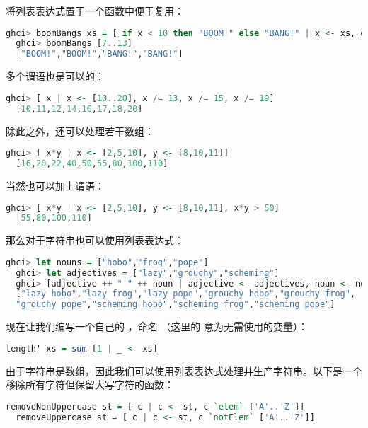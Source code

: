 \documentclass[./main.tex]{subfiles}
\begin{document}
将列表表达式置于一个函数中便于复用：

\begin{lstlisting}[language=Haskell]
  ghci> boomBangs xs = [ if x < 10 then "BOOM!" else "BANG!" | x <- xs, odd x]
  ghci> boomBangs [7..13]
  ["BOOM!","BOOM!","BANG!","BANG!"]
\end{lstlisting}

多个谓语也是可以的：

\begin{lstlisting}[language=Haskell]
  ghci> [ x | x <- [10..20], x /= 13, x /= 15, x /= 19]
  [10,11,12,14,16,17,18,20]
\end{lstlisting}

除此之外，还可以处理若干数组：

\begin{lstlisting}[language=Haskell]
  ghci> [ x*y | x <- [2,5,10], y <- [8,10,11]]
  [16,20,22,40,50,55,80,100,110]
\end{lstlisting}

当然也可以加上谓语：

\begin{lstlisting}[language=Haskell]
  ghci> [ x*y | x <- [2,5,10], y <- [8,10,11], x*y > 50]
  [55,80,100,110]
\end{lstlisting}

那么对于字符串也可以使用列表表达式：

\begin{lstlisting}[language=Haskell]
  ghci> let nouns = ["hobo","frog","pope"]
  ghci> let adjectives = ["lazy","grouchy","scheming"]
  ghci> [adjective ++ " " ++ noun | adjective <- adjectives, noun <- nouns]
  ["lazy hobo","lazy frog","lazy pope","grouchy hobo","grouchy frog",
  "grouchy pope","scheming hobo","scheming frog","scheming pope"]
\end{lstlisting}

现在让我们编写一个自己的 ，命名 （这里的 \acode{_} 意为无需使用的变量）：

\begin{lstlisting}[language=Haskell]
  length' xs = sum [1 | _ <- xs]
\end{lstlisting}

由于字符串是数组，因此我们可以使用列表表达式处理并生产字符串。以下是一个移除所有字符但保留大写字符的函数：

\begin{lstlisting}[language=Haskell]
  removeNonUppercase st = [ c | c <- st, c `elem` ['A'..'Z']]
  removeUppercase st = [ c | c <- st, c `notElem` ['A'..'Z']]
\end{lstlisting}
\end{document}
